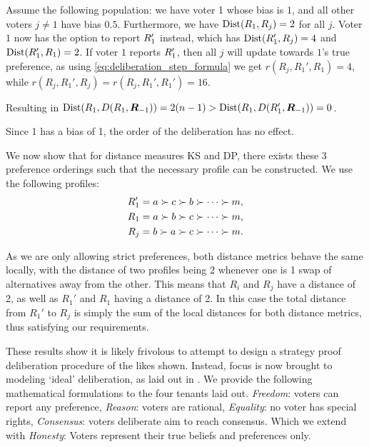 \begin{proofc} Assume the following population: we
	have voter 1 whose bias is $1$, and all other voters $j \neq 1$
	have bias $0.5$. Furthermore, we have
	$\operatorname{Dist}(R_1, R_j) = 2$ for all
	$j$. Voter $1$ now has the option to report $R_{1}'$
	instead, which has $\operatorname{Dist}(R_{1}',
		R_j) = 4$ and $\operatorname{Dist}(R_{1}',
		R_1) = 2$. If voter $1$ reports $R_1'$,
	then all $j$ will update towards $1$'s true preference, as
	using \cref{eq:deliberation_step_formula} we get $r(R_{j},
		R_{1}', R_1) = 4$, while $r(R_{j}, R_{1}', R_j) = r(R_{j},
		R_{1}', R_1') = 16$.

	Resulting in $\operatorname{Dist}(R_{1},
		D(R_{1},\boldsymbol{R}_{-1})) = 2(n-1) >
		\operatorname{Dist}(R_{1}, D(R_{1}', \boldsymbol{R}_{-1})) =
		0$.

	Since 1 has a bias of 1, the order of the deliberation has no
	effect.

	We now show that for distance measures KS and DP, there exists
	these 3 preference orderings such that the necessary profile
	can be constructed. We use the following profiles: \[
		\begin{aligned} R_{1}' & = a \succ c \succ b \succ
                \cdots \succ m,                    \\ R_{1}  & = a \succ b \succ c
                \succ \cdots \succ m,              \\ R_{j}  & = b \succ a \succ c
                \succ \cdots \succ m.              \\\end{aligned} \]

	As we are only allowing strict preferences, both distance metrics
	behave the same locally, with the distance of two profiles being 2 whenever one
	is 1 swap of alternatives away from the other. This means that  \(R_{i}\) and
	\(R_{j}\) have a distance of 2, as well as  \(R_{1}'\) and \(R_{1}\) having a
	distance of 2. In this case the total distance from \(R_{1}'\) to \(R_{j}\) is
	simply the sum of the local distances for both distance metrics, thus
	satisfying our requirements.\hfill \end{proofc}


These results show it is likely frivolous to attempt to design a strategy proof
deliberation procedure of the likes shown. Instead, focus is now brought to
modeling `ideal' deliberation, as laid out in .
We provide the following mathematical formulations to the four tenants laid
out. \emph{Freedom}: voters can report any preference, \emph{Reason}: voters
are rational, \emph{Equality}: no voter has special rights, \emph{Consensus}:
voters deliberate aim to reach consensus. Which we extend with \emph{Honesty}:
Voters represent their true beliefs and preferences only.


